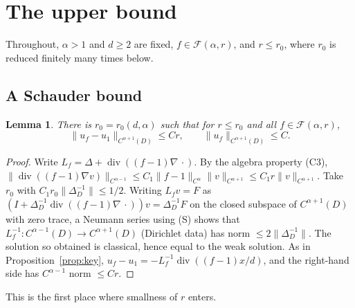 \documentclass[11pt]{article}
\newtheorem{lemma}[theorem]{Lemma}
\theoremstyle{definition}
\theoremstyle{remark}
\newcommand{\Fc}{\mathcal F}
\newcommand{\dv}{\operatorname{div}}
\begin{document}
\section{The upper bound}\label{sec:upper}


Throughout, $\alpha>1$ and $d\ge2$ are fixed, $f\in\Fc(\alpha,r)$, and $r\le r_0$, where $r_0$ is reduced finitely many times below.

\subsection{A Schauder bound}

\begin{lemma}\label{lem:C4}
There is $r_0=r_0(d,\alpha)$ such that for $r\le r_0$ and all $f\in\Fc(\alpha,r)$,
\begin{equation}\label{eq:C4}
\|u_f-u_1\|_{C^{\alpha+1}(D)}\le Cr,\qquad\|u_f\|_{C^{\alpha+1}(D)}\le C .
\end{equation}
\end{lemma}

\begin{proof}
Write $L_f=\Delta+\dv((f-1)\nabla\,\cdot)$. By the algebra property (C3),
$\|\dv((f-1)\nabla v)\|_{C^{\alpha-1}}\le C_1\|f-1\|_{C^\alpha}\|v\|_{C^{\alpha+1}}\le C_1r\|v\|_{C^{\alpha+1}}$.
Take $r_0$ with $C_1r_0\|\Delta_D^{-1}\|\le1/2$. Writing $L_fv=F$ as $(I+\Delta_D^{-1}\dv((f-1)\nabla\,\cdot))v=\Delta_D^{-1}F$ on the closed subspace of $C^{\alpha+1}(D)$ with zero trace, a Neumann series using (S) shows that $L_f^{-1}:C^{\alpha-1}(D)\to C^{\alpha+1}(D)$ (Dirichlet data) has norm $\le2\|\Delta_D^{-1}\|$. The solution so obtained is classical, hence equal to the weak solution. As in Proposition~\ref{prop:key}, $u_f-u_1=-L_f^{-1}\dv((f-1)x/d)$, and the right-hand side has $C^{\alpha-1}$ norm $\le Cr$.
\end{proof}


This is the first place where smallness of $r$ enters.
\end{document}
